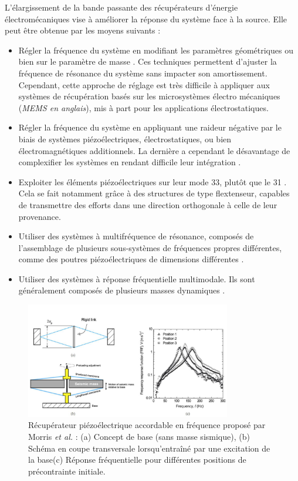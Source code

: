 L'élargissement de la bande passante des récupérateurs d'énergie électromécaniques vise à améliorer la réponse du système face à la source. Elle peut être obtenue par les moyens suivants :
\begin{itemize}[label=$\circ$]
	\item Régler la fréquence du système en modifiant les paramètres géométriques \cite{Jang2011} ou bien sur le paramètre de masse \cite{Karadag2017}. Ces techniques permettent d'ajuster la fréquence de résonance du système sans impacter son amortissement. Cependant, cette approche de réglage est très difficile à appliquer aux systèmes de récupération basés sur les microsystèmes électro mécaniques (\emph{MEMS en anglais}), mis à part pour les applications électrostatiques.
	\item Régler la fréquence du système en appliquant une raideur négative par le biais de systèmes piézoélectriques, électrostatiques, ou bien électromagnétiques additionnels. La dernière a cependant le désavantage de complexifier les systèmes en rendant difficile leur intégration \cite{Tang2013,Yildirim2017}.
   	\item Exploiter les éléments piézoélectriques sur leur mode 33, plutôt que le 31 \cite{Morris2008}. Cela se fait notamment grâce à des structures de type flextenseur, capables de transmettre des efforts dans une direction orthogonale à celle de leur provenance.
    \item Utiliser des systèmes à multifréquence de résonance, composés de l'assemblage de plusieurs sous-systèmes de fréquences propres différentes, comme des poutres piézoélectriques de dimensions différentes \cite{Sari2008}.
    \item Utiliser des systèmes à réponse fréquentielle multimodale. Ils sont généralement composés de plusieurs masses dynamiques \cite{Toyabur2018}.
\end{itemize}
\begin{figure}[!htbp]
	\begin{center}
		\captionsetup{justification=centering}
		\includegraphics[trim={0cm 0cm 0cm 2cm},clip,width=0.8\textwidth]{../Chap1/Figure/flextenseur.pdf}
		\caption{Récupérateur piézoélectrique accordable en fréquence proposé par Morris \emph{et al.} \cite{Morris2008}: (a) Concept de base (sans masse sismique), (b) Schéma en coupe transversale lorsqu'entraîné par une excitation de la base(c) Réponse fréquentielle pour différentes positions de précontrainte initiale.}
		\label{fig:flextenseur}
	\end{center}
\end{figure}
